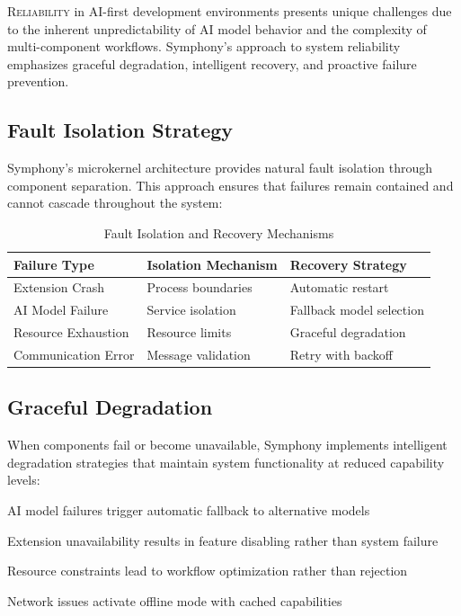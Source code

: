 
\lettrine{R}{eliability} in AI-first development environments presents unique challenges due to the inherent unpredictability of AI model behavior and the complexity of multi-component workflows. Symphony's approach to system reliability emphasizes graceful degradation, intelligent recovery, and proactive failure prevention.

\subsection*{Fault Isolation Strategy}

Symphony's microkernel architecture provides natural fault isolation through component separation. This approach ensures that failures remain contained and cannot cascade throughout the system:

\begin{table}[ht]
\centering
\begin{tabular}{@{}lll@{}}
\toprule
\textbf{Failure Type} & \textbf{Isolation Mechanism} & \textbf{Recovery Strategy} \\
\midrule
Extension Crash & Process boundaries & Automatic restart \\
AI Model Failure & Service isolation & Fallback model selection \\
Resource Exhaustion & Resource limits & Graceful degradation \\
Communication Error & Message validation & Retry with backoff \\
\bottomrule
\end{tabular}
\caption{Fault Isolation and Recovery Mechanisms}
\end{table}

\subsection*{Graceful Degradation}

When components fail or become unavailable, Symphony implements \textcolor{brandPrimary}{intelligent degradation strategies} that maintain system functionality at reduced capability levels:

\begin{compactlist}
    \item AI model failures trigger automatic fallback to alternative models
    \item Extension unavailability results in feature disabling rather than system failure
    \item Resource constraints lead to workflow optimization rather than rejection
    \item Network issues activate offline mode with cached capabilities
\end{compactlist}

